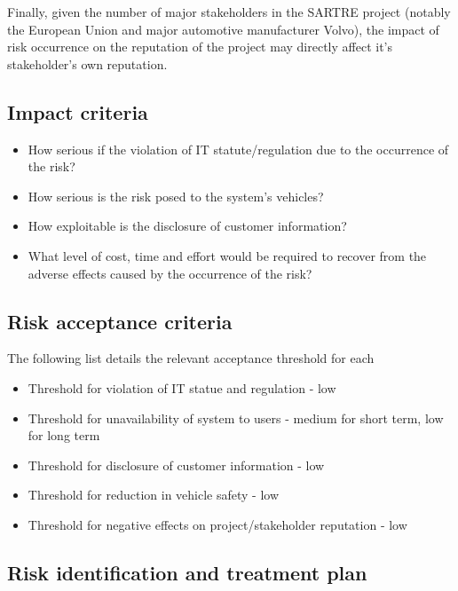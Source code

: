 \documentclass[british,11pt,a4paper]{article}
\begin{document}
Finally, given the number of major stakeholders in the SARTRE project (notably the European Union and major automotive manufacturer Volvo), the impact of risk occurrence on the reputation of the project may directly affect it's stakeholder's own reputation.

\subsection{Impact criteria}
\begin{itemize}
	\item How serious if the violation of IT statute/regulation due to the occurrence of the risk?
	\item How serious is the risk posed to the system's vehicles?
	\item How exploitable is the disclosure of customer information?
	\item What level of cost, time and effort would be required to recover from the adverse effects caused by the occurrence of the risk?
\end{itemize}

\subsection{Risk acceptance criteria}
The following list details the relevant acceptance threshold for each 
\begin{itemize}
	\item Threshold for violation of IT statue and regulation - low
	\item Threshold for unavailability of system to users - medium for short term, low for long term
	\item Threshold for disclosure of customer information - low
	\item Threshold for reduction in vehicle safety - low
	\item Threshold for negative effects on project/stakeholder reputation - low
\end{itemize}

\subsection{Risk identification and treatment plan}
\end{document}
